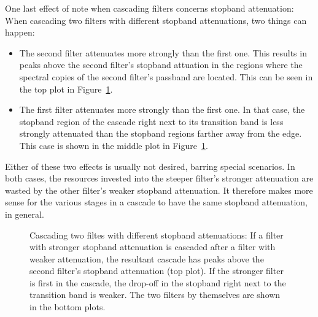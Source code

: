 One last effect of note when cascading filters concerns stopband attenuation:
When cascading two filters with different stopband attenuations, two things
can happen:
\begin{itemize}\tightlist
    \item
        The second  filter attenuates more  strongly than the  first one. This
        results  in peaks  above  the second  filter's  stopband attuation  in
        the  regions  where  the  spectral   copies  of  the  second  filter's
        passband  are   located. This  can  be   seen  in  the  top   plot  in
        Figure~\ref{fig:fdesign:cascade:ast_demo}.
    \item
        The first filter attenuates more  strongly than the first one. In that
        case, the stopband region of the  cascade right next to its transition
        band is  less strongly  attenuated than  the stopband  regions farther
        away  from  the  edge. This  case  is shown  in  the  middle  plot  in
        Figure~\ref{fig:fdesign:cascade:ast_demo}.
\end{itemize}
Either  of  these  two  effects   is  usually  not  desired,  barring  special
scenarios. In both  cases, the  resources invested  into the  steeper filter's
stronger  attenuation  are  wasted  by  the  other  filter's  weaker  stopband
attenuation. It therefore makes more sense for the various stages in a cascade
to have the same stopband attenuation, in general.

\begin{figure}
    \centering
    
    \caption[Cascade: Stopband Attenuation]{%
        Cascading two filtes with different stopband attenuations: If a filter
        with stronger  stopband attenuation  is cascaded  after a  filter with
        weaker attenuation, the  resultant cascade has peaks  above the second
        filter's stopband  attenuation (top  plot). If the stronger  filter is
        first in the  cascade, the drop-off in the stopband  right next to the
        transition band is weaker. The two  filters by themselves are shown in
        the bottom plots.%
    }
    \label{fig:fdesign:cascade:ast_demo}
\end{figure}


